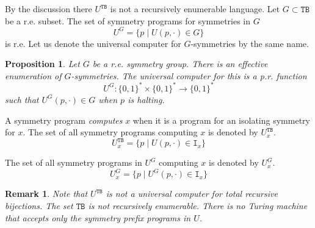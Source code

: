 \documentclass{article}
\newtheorem{proposition}[theorem]{Proposition}
\newtheorem{remark}[theorem]{Remark}
\newcommand{\bin}{\{0,1\}^*} %
\newcommand{\TB}{\mathtt{TB}}
\newcommand{\I}{\mathtt{I}}
\begin{document}
By the discussion there $U^{\TB}$ is not a recursively enumerable language. Let $G \subset \TB$ be a r.e. subset. The set of symmetry programs for symmetries in $G$
\begin{equation}
    U^G = \{ p \mid U(p, \cdot) \in G \}
\end{equation}
is r.e. Let us denote the universal computer for $G$-symmetries by the same name. 


\begin{proposition}
    \label{prop:symmcomp}
    Let $G$ be a r.e. symmetry group. There is an effective enumeration of $G$-symmetries. The universal computer for this is a p.r. function 
    \begin{equation}
    U^G: \bin \times \bin \to \bin 
    \end{equation}
    such that $U^G(p, \cdot) \in G$ when $p$ is halting. 
\end{proposition}

A symmetry program \emph{computes} $x$ when it is a program for an isolating symmetry for $x$. The set of all symmetry programs computing $x$ is denoted by $U^{\TB}_x$.
\begin{equation}
    U^{\TB}_x = \{ p \mid U(p, \cdot) \in \I_x\}
\end{equation}

The set of all symmetry programs in $U^G$ computing $x$ is denoted by $U^G_x$.
\begin{equation}
    U^{G}_x = \{ p \mid U^G(p, \cdot) \in \I_x\}
\end{equation}



\begin{remark}
Note that $U^{\TB}$ is not a universal computer for total recursive bijections. The set $\TB$ is not recursively enumerable. There is no Turing machine that accepts only the symmetry prefix programs in $U$.  
\end{remark}
\end{document}
